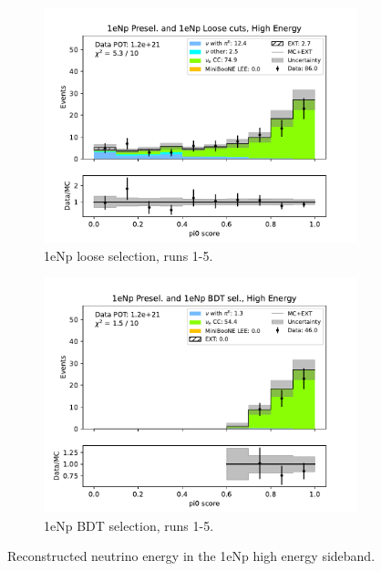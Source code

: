 \begin{figure}[H]
\begin{subfigure}{0.33\linewidth}
    \includegraphics[width=\linewidth]{technote/Sidebands/Figures/FarSideband/far_sideband_pi0_score_run1234a4b4c4d5_NP_NPL_HIGH_ENERGY.pdf}
    \caption{1eNp loose selection, runs 1-5.}
    \end{subfigure}%
    \begin{subfigure}{0.33\linewidth}
    \includegraphics[width=\linewidth]{technote/Sidebands/Figures/FarSideband/far_sideband_pi0_score_run1234a4b4c4d5_NP_NPBDT_HIGH_ENERGY.pdf}
    \caption{1eNp BDT selection, runs 1-5.}
    \end{subfigure}
    \caption{Reconstructed neutrino energy in the 1eNp high energy sideband.}
    \label{fig:HighEnergy1eNp_pi0_score}
\end{figure}

